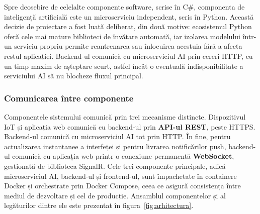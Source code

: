 \documentclass[12pt,a4paper]{article}
\begin{document}
Spre deosebire de celelalte componente software, scrise în C\#, componenta de inteligență artificială este un microserviciu independent, scris în Python. Această decizie de proiectare a fost luată deliberat, din două motive: ecosistemul Python oferă cele mai mature biblioteci de învățare automată, iar izolarea modelului într-un serviciu propriu permite reantrenarea sau înlocuirea acestuia fără a afecta restul aplicației. Backend-ul comunică cu microserviciul AI prin cereri HTTP, cu un timp maxim de așteptare scurt, astfel încât o eventuală indisponibilitate a serviciului AI să nu blocheze fluxul principal.

\subsubsection{Comunicarea între componente}

Componentele sistemului comunică prin trei mecanisme distincte. Dispozitivul IoT și aplicația web comunică cu backend-ul prin \textbf{API-ul REST}, peste HTTPS. Backend-ul comunică cu microserviciul AI tot prin HTTP. În fine, pentru actualizarea instantanee a interfeței și pentru livrarea notificărilor push, backend-ul comunică cu aplicația web printr-o conexiune permanentă \textbf{WebSocket}, gestionată de biblioteca SignalR. Cele trei componente principale, adică microserviciul AI, backend-ul și frontend-ul, sunt împachetate în containere Docker și orchestrate prin Docker Compose, ceea ce asigură consistența între mediul de dezvoltare și cel de producție. Ansamblul componentelor și al legăturilor dintre ele este prezentat în figura~\ref{fig:arhitectura}.
\end{document}
